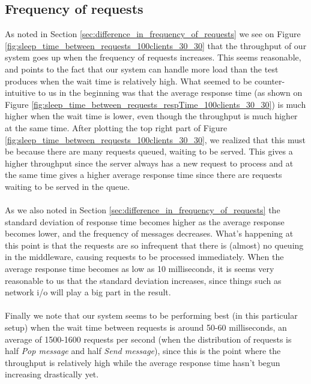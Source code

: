 \documentclass{article}
\begin{document}
        \subsection{Frequency of requests}
            \label{sec:frequency_of_requests}
            As noted in Section \ref{sec:difference_in_frequency_of_requests} we see on Figure \ref{fig:sleep_time_between_requests_100clients_30_30} that the throughput of our system goes up when the frequency of requests increases. This seems reasonable, and points to the fact that our system can handle more load than the test produces when the wait time is relatively high. What seemed to be counter-intuitive to us in the beginning was that the average response time (as shown on Figure \ref{fig:sleep_time_between_requests_respTime_100clients_30_30}) is much higher when the wait time is lower, even though the throughput is much higher at the same time. After plotting the top right part of Figure \ref{fig:sleep_time_between_requests_100clients_30_30}, we realized that this must be because there are many requests queued, waiting to be served. This gives a higher throughput since the server always has a new request to process and at the same time gives a higher average response time since there are requests waiting to be served in the queue.\\
            \\
            As we also noted in Section \ref{sec:difference_in_frequency_of_requests} the standard deviation of response time becomes higher as the average response becomes lower, and the frequency of messages decreases. What's happening at this point is that the requests are so infrequent that there is (almost) no queuing in the middleware, causing requests to be processed immediately. When the average response time becomes as low as 10 milliseconds, it is seems very reasonable to us that the standard deviation increases, since things such as network i/o will play a big part in the result.\\
            \\
            Finally we note that our system seems to be performing best (in this particular setup) when the wait time between requests is around 50-60 milliseconds, an average of 1500-1600 requests per second (when the distribution of requests is half \textit{Pop message} and half \textit{Send message}), since this is the point where the throughput is relatively high while the average response time hasn't begun increasing drastically yet.
\end{document}
